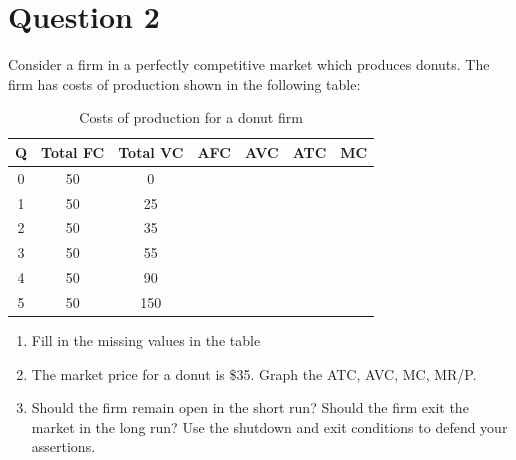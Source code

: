 \documentclass[12pt]{article}
\begin{document}
\newpage

\section*{Question 2}
Consider a firm in a perfectly competitive market which produces donuts. The firm has costs of production shown in the following table:


\begin{table}[H]
    \centering
    \begin{tabular}{ccccccc}
    \hline
        Q & Total FC & Total VC & AFC & AVC & ATC & MC \\
        \hline
        \hline
         0 & 50 & 0 & & & &  \\
         1 & 50 & 25 & & & & \\
         2 & 50 & 35 & & & &  \\
         3 & 50 & 55 & & & &  \\
         4 & 50 & 90 & & & &  \\
         5 & 50 & 150 & & & & \\
         \hline
    \end{tabular}
    \caption{Costs of production for a donut firm}
    \label{tab:placeholder}
\end{table}

\begin{enumerate}[label = (\alph*)]
    \item Fill in the missing values in the table
    \item The market price for a donut is \$35. Graph the ATC, AVC, MC, MR/P.
    \item  Should the firm remain open in the short run? Should the firm exit the market in the long run? Use the shutdown and exit conditions to defend your assertions.
\end{enumerate}
\end{document}
